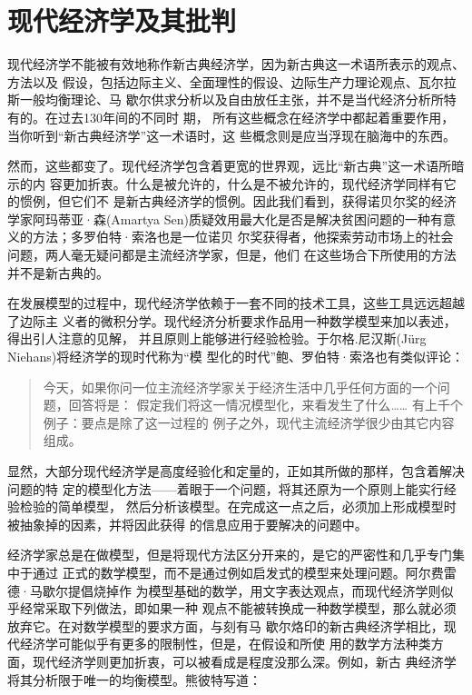 \part{现代经济学及其批判}


现代经济学不能被有效地称作新古典经济学，因为新古典这一术语所表示的观点、方法以及
假设，包括边际主义、全面理性的假设、边际生产力理论观点、瓦尔拉斯一般均衡理论、马
歇尔供求分析以及自由放任主张，并不是当代经济分析所特有的。在过去130年间的不同时
期， 所有这些概念在经济学中都起着重要作用，当你听到“新古典经济学”这一术语时，这
些概念则是应当浮现在脑海中的东西。

然而，这些都变了。现代经济学包含着更宽的世界观，远比“新古典”这一术语所暗示的内
容更加折衷。什么是被允许的，什么是不被允许的，现代经济学同样有它的惯例，但它们不
是新古典经济学的惯例。因此我们看到，获得诺贝尔奖的经济学家阿玛蒂亚·森(Amartya
Sen)质疑效用最大化是否是解决贫困问题的一种有意义的方法；多罗伯特·索洛也是一位诺贝
尔奖获得者，他探索劳动市场上的社会问题，两人毫无疑问都是主流经济学家，但是，他们
在这些场合下所使用的方法并不是新古典的。

在发展模型的过程中，现代经济学依赖于一套不同的技术工具，这些工具远远超越了边际主
义者的微积分学。现代经济分析要求作品用一种数学模型来加以表述，得出引人注意的见解，
并且原则上能够进行经验检验。于尔格.尼汉斯(J\"urg Niehans)将经济学的现时代称为“模
型化的时代”鲍、罗伯特·索洛也有类似评论：

\begin{quotation}
  今天，如果你问一位主流经济学家关于经济生活中几乎任何方面的一个问题，回答将是：
  假定我们将这一情况模型化，来看发生了什么…… 有上千个例子：要点是除了这一过程的
  例子之外，现代主流经济学很少由其它内容组成。
\end{quotation}

显然，大部分现代经济学是高度经验化和定量的，正如其所做的那样，包含着解决问题的特
定的模型化方法——着眼于一个问题，将其还原为一个原则上能实行经验检验的简单模型，
然后分析该模型。在完成这一点之后，必须加上形成模型时被抽象掉的因素，并将因此获得
的信息应用于要解决的问题中。

经济学家总是在做模型，但是将现代方法区分开来的，是它的严密性和几乎专门集中于通过
正式的数学模型，而不是通过例如启发式的模型来处理问题。阿尔费雷德·马歇尔提倡烧掉作
为模型基础的数学，用文字表达观点，而现代经济学则似乎经常采取下列做法，即如果一种
观点不能被转换成一种数学模型，那么就必须放弃它。在对数学模型的要求方面，与刻有马
歇尔烙印的新古典经济学相比，现代经济学可能似乎有更多的限制性，但是，在假设和所使
用的数学方法种类方面，现代经济学则更加折衷，可以被看成是程度没那么深。例如，新古
典经济学将其分析限于唯一的均衡模型。熊彼特写道：

